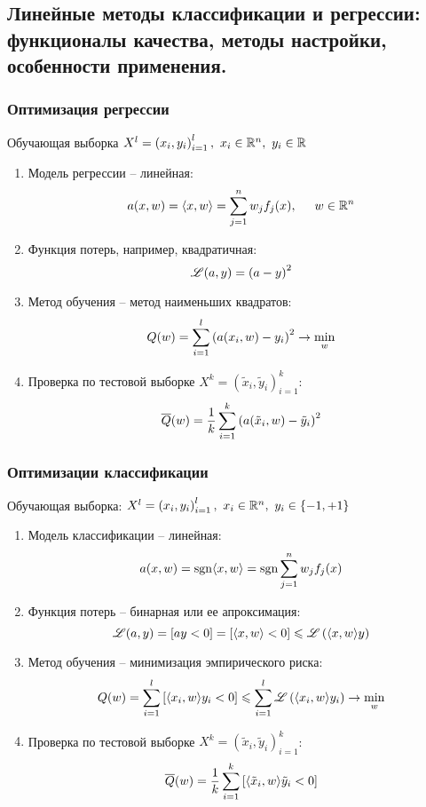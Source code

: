 \begin{multicols}{2}
    \section{Линейные методы классификации и регрессии: функционалы качества, методы
    настройки, особенности применения.}
    \subsubsection*{Оптимизация регрессии}
    Обучающая выборка $X^l = \left(x_i, y_i\right)_{i=1}^l, \ x_i \in \mathbb{R}^n, \ y_i \in \mathbb{R}$
    \begin{enumerate}
      \item Модель регрессии -- линейная:
      \[
          a(x,w) = \langle x, w\rangle = \sum\limits_{j=1}^n w_jf_j(x), \hspace*{0.5cm} w\in \mathbb{R}^n 
      \]
      \item Функция потерь, например, квадратичная:
      \[
          \mathscr{L}(a,y) = \left(a-y\right)^2
      \]
      \item Метод обучения -- метод наименьших квадратов:
      \[
          Q(w) = \sum\limits_{i=1}^l\left(a(x_i, w) - y_i\right)^2 \to \min\limits_{w}
      \]
      \item Проверка по тестовой выборке $X^k = \left(\tilde{x}_i, \tilde{y}_i\right)_{i=1}^k$:
      \[
          \overline{Q}(w) = \dfrac{1}{k}\sum\limits_{i=1}^k\left(a(\tilde{x}_i, w) - \tilde{y}_i\right)^2
      \]
    \end{enumerate} 
    \subsubsection*{Оптимизации классификации}
     Обучающая выборка: $X^l = \left(x_i, y_i\right)_{i=1}^l, \ x_i\in \mathbb{R}^n, \ y_i \in \{-1, +1\}$
     \begin{enumerate}
      \item Модель классификации -- линейная:
      \[
          a(x,w) = \operatorname{sgn} \langle x,w \rangle = \operatorname{sgn} \sum\limits_{j=1}^n w_jf_j(x)
      \]
      \item Функция потерь -- бинарная или ее апроксимация:
      \[
          \mathscr{L} (a, y) = [ay < 0] = [\langle x,w \rangle < 0] \leqslant \mathscr{L} \left(\langle x, w \rangle y\right)
      \]  
      \item Метод обучения -- минимизация эмпирического риска:
      \[
          Q(w) = \sum\limits_{i=1}^l \left[\langle x_i, w\rangle y_i < 0\right] \leqslant \sum\limits_{i=1}^l \mathscr{L} \left(\langle x_i, w\rangle y_i\right) \to \min\limits_w
      \]
      \item Проверка по тестовой выборке $X^k = \left(\tilde{x}_i, \tilde{y}_i\right)_{i=1}^k$:
      \[
          \overline{Q}(w) = \dfrac{1}{k}\sum\limits_{i=1}^k \left[\langle\tilde{x}_i, w\rangle \tilde{y}_i < 0\right]
      \]
     \end{enumerate}

\end{multicols}
